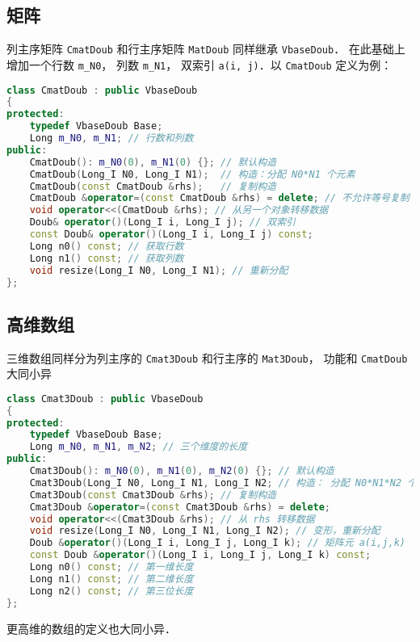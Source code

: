 \subsection{矩阵}
列主序矩阵 \verb|CmatDoub| 和行主序矩阵 \verb|MatDoub| 同样继承 \verb|VbaseDoub|． 在此基础上增加一个行数 \verb|m_N0|， 列数 \verb|m_N1|， 双索引 \verb|a(i, j)|．以 \verb|CmatDoub| 定义为例：
\begin{lstlisting}[language=cpp]
class CmatDoub : public VbaseDoub
{
protected:
    typedef VbaseDoub Base;
    Long m_N0, m_N1; // 行数和列数
public:
    CmatDoub(): m_N0(0), m_N1(0) {}; // 默认构造
    CmatDoub(Long_I N0, Long_I N1);  // 构造：分配 N0*N1 个元素
    CmatDoub(const CmatDoub &rhs);   // 复制构造
    CmatDoub &operator=(const CmatDoub &rhs) = delete; // 不允许等号复制
    void operator<<(CmatDoub &rhs); // 从另一个对象转移数据
    Doub& operator()(Long_I i, Long_I j); // 双索引
    const Doub& operator()(Long_I i, Long_I j) const;
    Long n0() const; // 获取行数
    Long n1() const; // 获取列数
    void resize(Long_I N0, Long_I N1); // 重新分配
};
\end{lstlisting}

\subsection{高维数组}
三维数组同样分为列主序的 \verb|Cmat3Doub| 和行主序的 \verb|Mat3Doub|， 功能和 \verb|CmatDoub| 大同小异
\begin{lstlisting}[language=cpp]
class Cmat3Doub : public VbaseDoub
{
protected:
    typedef VbaseDoub Base;
    Long m_N0, m_N1, m_N2; // 三个维度的长度
public:
    Cmat3Doub(): m_N0(0), m_N1(0), m_N2(0) {}; // 默认构造
    Cmat3Doub(Long_I N0, Long_I N1, Long_I N2; // 构造： 分配 N0*N1*N2 个元素
    Cmat3Doub(const Cmat3Doub &rhs); // 复制构造
    Cmat3Doub &operator=(const Cmat3Doub &rhs) = delete;
    void operator<<(Cmat3Doub &rhs); // 从 rhs 转移数据
    void resize(Long_I N0, Long_I N1, Long_I N2); // 变形，重新分配
    Doub &operator()(Long_I i, Long_I j, Long_I k); // 矩阵元 a(i,j,k)
    const Doub &operator()(Long_I i, Long_I j, Long_I k) const;
    Long n0() const; // 第一维长度
    Long n1() const; // 第二维长度
    Long n2() const; // 第三位长度
};
\end{lstlisting}

更高维的数组的定义也大同小异．
